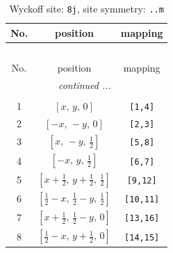 \documentclass[fleqn,8pt]{jsarticle}
\begin{document}
\begin{longtable}{ccc}
\caption{Wyckoff site: {\tt 8j}, site symmetry: {\tt ..m}}
 \\
 \hline \hline
No. & position & mapping \\ \hline \endfirsthead

\multicolumn{2}{l}{\tablename\ \thetable{}} \\
 \hline \hline
No. & position & mapping \\ \hline \endhead

 \hline \hline
\multicolumn{2}{r}{\footnotesize\it continued ...} \\ \endfoot

 \hline \hline
\multicolumn{2}{r}{} \\ \endlastfoot

1 & $\left[ x,\, y,\, 0 \right]$ & {\tt [1,4]} \\ \hline
2 & $\left[ - x,\, - y,\, 0 \right]$ & {\tt [2,3]} \\ \hline
3 & $\left[ x,\, - y,\, \frac{1}{2} \right]$ & {\tt [5,8]} \\ \hline
4 & $\left[ - x,\, y,\, \frac{1}{2} \right]$ & {\tt [6,7]} \\ \hline
5 & $\left[ x + \frac{1}{2},\, y + \frac{1}{2},\, \frac{1}{2} \right]$ & {\tt [9,12]} \\ \hline
6 & $\left[ \frac{1}{2} - x,\, \frac{1}{2} - y,\, \frac{1}{2} \right]$ & {\tt [10,11]} \\ \hline
7 & $\left[ x + \frac{1}{2},\, \frac{1}{2} - y,\, 0 \right]$ & {\tt [13,16]} \\ \hline
8 & $\left[ \frac{1}{2} - x,\, y + \frac{1}{2},\, 0 \right]$ & {\tt [14,15]} \\
\end{longtable}
\renewcommand{\arraystretch}{1.2}
\end{document}

